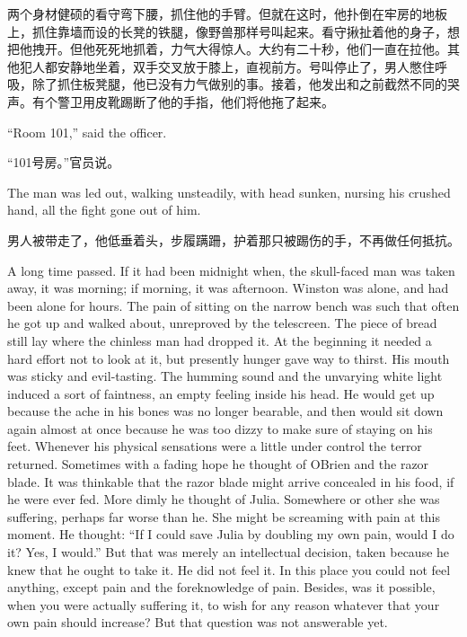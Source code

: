 \begin{paracol}{2}
\switchcolumn

两个身材健硕的看守弯下腰，抓住他的手臂。但就在这时，他扑倒在牢房的地板上，抓住靠墙而设的长凳的铁腿，像野兽那样号叫起来。看守揪扯着他的身子，想把他拽开。但他死死地抓着，力气大得惊人。大约有二十秒，他们一直在拉他。其他犯人都安静地坐着，双手交叉放于膝上，直视前方。号叫停止了，男人憋住呼吸，除了抓住板凳腿，他已没有力气做别的事。接着，他发出和之前截然不同的哭声。有个警卫用皮靴踢断了他的手指，他们将他拖了起来。

\switchcolumn*

``Room 101,'' said the officer.

\switchcolumn

``101号房。''官员说。

\switchcolumn*

The man was led out, walking unsteadily, with head sunken, nursing his
crushed hand, all the fight gone out of him.

\switchcolumn

男人被带走了，他低垂着头，步履蹒跚，护着那只被踢伤的手，不再做任何抵抗。

\switchcolumn*

A long time passed. If it had been midnight when, the skull-faced man
was taken away, it was morning; if morning, it was afternoon. Winston
was alone, and had been alone for hours. The pain of sitting on the
narrow bench was such that often he got up and walked about, unreproved
by the telescreen. The piece of bread still lay where the chinless man
had dropped it. At the beginning it needed a hard effort not to look at
it, but presently hunger gave way to thirst. His mouth was sticky and
evil-tasting. The humming sound and the unvarying white light induced a
sort of faintness, an empty feeling inside his head. He would get up
because the ache in his bones was no longer bearable, and then would sit
down again almost at once because he was too dizzy to make sure of
staying on his feet. Whenever his physical sensations were a little
under control the terror returned. Sometimes with a fading hope he
thought of O\textquotesingle Brien and the razor blade. It was thinkable
that the razor blade might arrive concealed in his food, if he were ever
fed. More dimly he thought of Julia. Somewhere or other she was
suffering, perhaps far worse than he. She might be screaming with pain
at this moment. He thought: ``If I could save Julia by doubling my own
pain, would I do it? Yes, I would.'' But that was merely an intellectual
decision, taken because he knew that he ought to take it. He did not
feel it. In this place you could not feel anything, except pain and the
foreknowledge of pain. Besides, was it possible, when you were actually
suffering it, to wish for any reason whatever that your own pain should
increase? But that question was not answerable yet.


\end{paracol}
